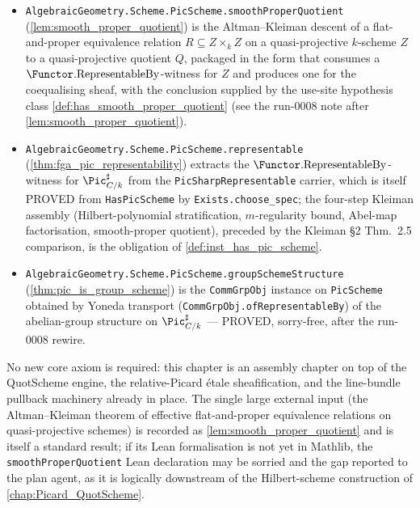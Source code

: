 \begin{itemize}
    of the source \(\mathrm{Div}_{C/k}\) by an open subscheme of the
    Hilbert scheme (Kleiman~\S 3, Thm.~th:repDiv,
    \cref{rem:div_functor_representability}) is separate future work,
    not needed for \texttt{abelMap} itself.
  \item \texttt{AlgebraicGeometry.Scheme.PicScheme.smoothProperQuotient}
    (\cref{lem:smooth_proper_quotient}) is the Altman--Kleiman
    descent of a flat-and-proper equivalence relation \(R \subseteq Z
    \times_k Z\) on a quasi-projective \(k\)-scheme \(Z\) to a
    quasi-projective quotient \(Q\), packaged in the form that consumes
    a \(\Functor.\mathrm{RepresentableBy}\)-witness for \(Z\) and produces
    one for the coequalising sheaf, with the conclusion supplied by the
    use-site hypothesis class \cref{def:has_smooth_proper_quotient}
    (see the run-0008 note after \cref{lem:smooth_proper_quotient}).
  \item \texttt{AlgebraicGeometry.Scheme.PicScheme.representable}
    (\cref{thm:fga_pic_representability}) extracts the
    \(\Functor.\mathrm{RepresentableBy}\)-witness for
    \(\Pic^\sharp_{C/k}\) from the \texttt{PicSharpRepresentable} carrier,
    which is itself PROVED from \texttt{HasPicScheme} by
    \texttt{Exists.choose\_spec}; the four-step Kleiman assembly
    (Hilbert-polynomial stratification, \(m\)-regularity bound, Abel-map
    factorisation, smooth-proper quotient), preceded by the Kleiman \S 2
    Thm.~2.5 comparison, is the obligation of
    \cref{def:inst_has_pic_scheme}.
  \item \texttt{AlgebraicGeometry.Scheme.PicScheme.groupSchemeStructure}
    (\cref{thm:pic_is_group_scheme}) is the \texttt{CommGrpObj} instance
    on \texttt{PicScheme} obtained by Yoneda transport
    (\texttt{CommGrpObj.ofRepresentableBy}) of the abelian-group structure
    on \(\Pic^\sharp_{C/k}\) — PROVED, sorry-free, after the run-0008
    rewire.
\end{itemize}

No new core axiom is required: this chapter is an assembly chapter on
top of the QuotScheme engine, the relative-Picard \'etale sheafification,
and the line-bundle pullback machinery already in place. The single
large external input (the Altman--Kleiman theorem of effective
flat-and-proper equivalence relations on quasi-projective schemes) is
recorded as \cref{lem:smooth_proper_quotient} and is itself a standard
result; if its Lean formalisation is not yet in Mathlib, the
\texttt{smoothProperQuotient} Lean declaration may be sorried and the
gap reported to the plan agent, as it is logically downstream of the
Hilbert-scheme construction of \cref{chap:Picard_QuotScheme}.

